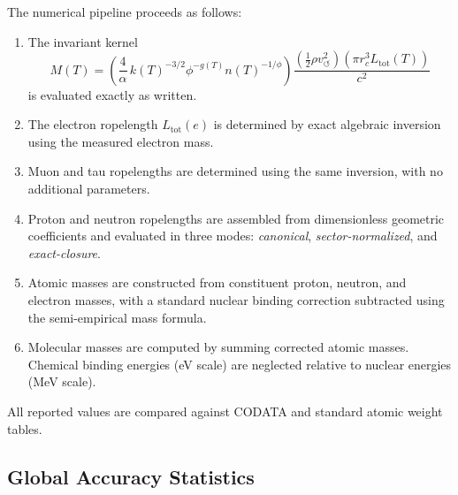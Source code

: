 \documentclass[11pt,a4paper]{article}
\begin{document}
            The numerical pipeline proceeds as follows:

            \begin{enumerate}
                \item The invariant kernel
                \[
                    M(T)
                    =
                    \left(
                        \frac{4}{\alpha}
                        \, k(T)^{-3/2}
                        \phi^{-g(T)}
                        n(T)^{-1/\phi}
                    \right)
                    \frac{
                        \left(\frac{1}{2}\rho v_{\circlearrowleft}^2\right)
                        \left(\pi r_c^3 L_{\mathrm{tot}}(T)\right)
                    }{c^2}
                \]
                is evaluated exactly as written.

                \item The electron ropelength $L_{\mathrm{tot}}(e)$ is determined by exact
                algebraic inversion using the measured electron mass.

                \item Muon and tau ropelengths are determined using the same inversion,
                with no additional parameters.

                \item Proton and neutron ropelengths are assembled from dimensionless
                geometric coefficients and evaluated in three modes:
                \emph{canonical}, \emph{sector-normalized}, and \emph{exact-closure}.

                \item Atomic masses are constructed from constituent proton, neutron,
                and electron masses, with a standard nuclear binding correction
                subtracted using the semi-empirical mass formula.

                \item Molecular masses are computed by summing corrected atomic masses.
                Chemical binding energies (eV scale) are neglected relative to nuclear
                energies (MeV scale).
            \end{enumerate}

            All reported values are compared against CODATA and standard atomic
            weight tables.

        \subsection{Global Accuracy Statistics}
\end{document}
